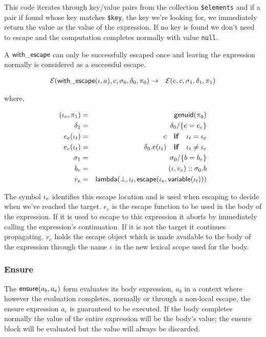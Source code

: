 \documentclass{article}
\begin{document}
This code iterates through key/value pairs from the collection \texttt{\$elements}
and if a pair if found whose key matches \texttt{\$key}, the key we're looking for,
we immediately return the value as the value of the expression. If no key is
found we don't need to escape and the computation completes normally with value
\texttt{null}.

A $\mathsf{with\_escape}$ can only be successfully escaped once and leaving the
expression normally is considered as a successful escape.

\begin{eqnarray*}
\mathcal{E}(\mathsf{with\_escape}(\iota, a), c, \sigma_0, \delta_0, \pi_0) & \to & 
\mathcal{E}(e, c, \sigma_1, \delta_1, \pi_1)
\end{eqnarray*}

where,

\begin{eqnarray*}
(\iota_e, \pi_1) & = & \mathsf{genuid}(\pi_0) \\
\delta_1 & = & \delta_0 / \{ e = e_e \} \\
e_e(\iota_t) & = & c \quad \mathbf{if} \quad \iota_t = \iota_e \\
e_e(\iota_t) & = & \delta_0.e(\iota_t) \quad \mathbf{if} \quad \iota_t \neq \iota_e \\
\sigma_1 & = & \sigma_0 / \{ b = b_e \} \\
b_e & = & (\iota, v_e) :: \sigma_0.b \\
v_e & = & \mathsf{lambda}(\bot, \iota_l, \mathsf{escape}(\iota_e, \mathsf{variable}(\iota_l)))
\end{eqnarray*}

The symbol $\iota_e$ identifies this escape location and is used when escaping
to decide when we've reached the target. $e_e$ is the escape function to be
used in the body of the expression. If it is used to escape to this expression
it aborts by immediately calling the expression's continuation. If it is not
the target it continues propagating. $v_e$ holds the escape object which is made
available to the body of the expression through the name $\iota$ in the new
lexical scope used for the body.

\subsubsection{Ensure}

The $\mathsf{ensure}(a_b, a_e) $ form evaluates its body expression, $a_b$ in a
context where however the evaluation completes, normally or through a non-local
escape, the ensure expression $a_e $ is guaranteed to be executed. If the body
completes normally the value of the entire expression will be the body's value;
the ensure block will be evaluated but the value will always be discarded.
\end{document}
